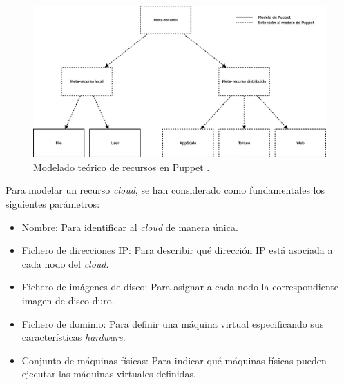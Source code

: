 \begin{figure} [!htbp]
  \centering
  \includegraphics[width=\textwidth]{figuras/Modelo_Teorico_Puppet.eps}
  \caption{Modelado teórico de recursos en Puppet .}
\label{figure:puppet-modelo-teorico}
\end{figure}



Para modelar un recurso \emph{cloud}, se han considerado como fundamentales los siguientes parámetros:

\begin{itemize}
\item Nombre: Para identificar al \emph{cloud} de manera única.
\item Fichero de direcciones IP: Para describir qué dirección IP está asociada a cada nodo del \emph{cloud}.
\item Fichero de imágenes de disco: Para asignar a cada nodo la correspondiente imagen de disco duro.
\item Fichero de dominio: Para definir una máquina virtual especificando sus características \emph{hardware}.
\item Conjunto de máquinas físicas: Para indicar qué máquinas físicas pueden ejecutar las máquinas virtuales definidas.
\end{itemize}

